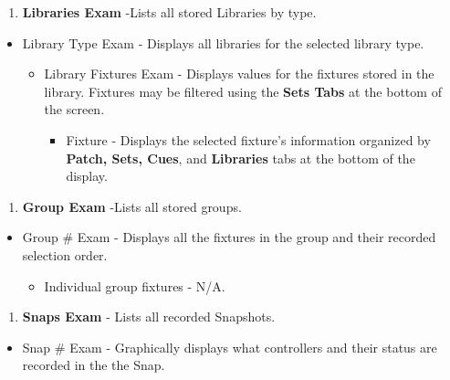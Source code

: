 \documentclass[
]{article}
\providecommand{\tightlist}{%
  \setlength{\itemsep}{0pt}\setlength{\parskip}{0pt}}
\begin{document}
\begin{enumerate}
\def\labelenumi{\arabic{enumi}.}
\setcounter{enumi}{1}
\tightlist
\item
  \textbf{Libraries Exam} -Lists all stored Libraries by type.
\end{enumerate}

\begin{itemize}
\item
  Library Type Exam - Displays all libraries for the selected library type.

  \begin{itemize}
  \item
    Library Fixtures Exam - Displays values for the fixtures stored in the library. Fixtures may be filtered using the \textbf{Sets Tabs} at the bottom of the screen.

    \begin{itemize}
    \tightlist
    \item
      Fixture - Displays the selected fixture's information organized by \textbf{Patch, Sets, Cues}, and \textbf{Libraries} tabs at the bottom of the display.
    \end{itemize}
  \end{itemize}
\end{itemize}

\begin{enumerate}
\def\labelenumi{\arabic{enumi}.}
\setcounter{enumi}{2}
\tightlist
\item
  \textbf{Group Exam} -Lists all stored groups.
\end{enumerate}

\begin{itemize}
\item
  Group \# Exam - Displays all the fixtures in the group and their recorded selection order.

  \begin{itemize}
  \tightlist
  \item
    Individual group fixtures - N/A.
  \end{itemize}
\end{itemize}

\begin{enumerate}
\def\labelenumi{\arabic{enumi}.}
\setcounter{enumi}{3}
\tightlist
\item
  \textbf{Snaps Exam} - Lists all recorded Snapshots.
\end{enumerate}

\begin{itemize}
\tightlist
\item
  Snap \# Exam - Graphically displays what controllers and their status are recorded in the the Snap.
\end{itemize}
\end{document}
